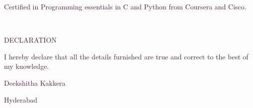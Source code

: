 \documentclass[12pt]{article}
\begin{document}
\begin{justify}

 \textcolor[HTML]{481A34}{Certified} \textcolor[HTML]{481A34}{ } \textcolor[HTML]{481A34}{in} \textcolor[HTML]{481A34}{ } \textcolor[HTML]{481A34}{Programming} \textcolor[HTML]{481A34}{ } \textcolor[HTML]{481A34}{essentials} \textcolor[HTML]{481A34}{ } \textcolor[HTML]{481A34}{in} \textcolor[HTML]{481A34}{ } \textcolor[HTML]{481A34}{C} \textcolor[HTML]{481A34}{ } \textcolor[HTML]{481A34}{and} \textcolor[HTML]{481A34}{ } \textcolor[HTML]{481A34}{Python} \textcolor[HTML]{481A34}{ } \textcolor[HTML]{481A34}{from} \textcolor[HTML]{481A34}{ } \textcolor[HTML]{481A34}{Coursera} \textcolor[HTML]{481A34}{ } \textcolor[HTML]{481A34}{and} \textcolor[HTML]{481A34}{ } \textcolor[HTML]{481A34}{Cisco.}
\end{justify}
\\
\begin{justify}
\textcolor[HTML]{481A34}{DECLARATION}
\end{justify}
\begin{justify}
\textcolor[HTML]{481A34}{I} \textcolor[HTML]{481A34}{ } \textcolor[HTML]{481A34}{hereby} \textcolor[HTML]{481A34}{ } \textcolor[HTML]{481A34}{declare} \textcolor[HTML]{481A34}{ } \textcolor[HTML]{481A34}{that} \textcolor[HTML]{481A34}{ } \textcolor[HTML]{481A34}{all} \textcolor[HTML]{481A34}{ } \textcolor[HTML]{481A34}{the} \textcolor[HTML]{481A34}{ } \textcolor[HTML]{481A34}{details} \textcolor[HTML]{481A34}{ } \textcolor[HTML]{481A34}{furnished} \textcolor[HTML]{481A34}{ } \textcolor[HTML]{481A34}{are} \textcolor[HTML]{481A34}{ } \textcolor[HTML]{481A34}{true} \textcolor[HTML]{481A34}{ } \textcolor[HTML]{481A34}{and} \textcolor[HTML]{481A34}{ } \textcolor[HTML]{481A34}{correct} \textcolor[HTML]{481A34}{ } \textcolor[HTML]{481A34}{to} \textcolor[HTML]{481A34}{ } \textcolor[HTML]{481A34}{the} \textcolor[HTML]{481A34}{ } \textcolor[HTML]{481A34}{best} \textcolor[HTML]{481A34}{ } \textcolor[HTML]{481A34}{of} \textcolor[HTML]{481A34}{ } \textcolor[HTML]{481A34}{my} \textcolor[HTML]{481A34}{ } \textcolor[HTML]{481A34}{knowledge.}
\end{justify}
\begin{flushright}
\textcolor[HTML]{481A34}{Deekshitha} \textcolor[HTML]{481A34}{ } \textcolor[HTML]{481A34}{Kakkera}
\end{flushright}
\begin{flushright}
\textcolor[HTML]{481A34}{Hyderabad}
\end{flushright}
\end{document}
